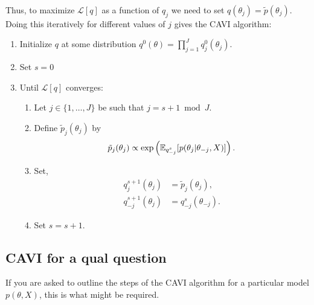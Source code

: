 Thus, to maximize $\mathcal{L}[q]$ as a function of $q_j$ we need to set $q(\theta_j)=\tilde{p}(\theta_j)$. Doing this iteratively for different values of $j$ gives the CAVI algorithm:
\begin{enumerate}
    \item Initialize $q$ at some distribution $q^0(\theta) = \prod_{j=1}^J q^0_j(\theta_j)$. 
    \item Set $s=0$
    \item Until $\mathcal{L}[q]$ converges:
    \begin{enumerate}
        \item Let $j \in \{1,\ldots, J\}$ be such that $j=s+1 \bmod J$.
        \item Define $\tilde{p}_j(\theta_j)$ by 
        \[\tilde{p}_j(\theta_j) \propto \exp\left({\mathbb E}_{q_{-j}^s}[p(\theta_j |  \theta_{-j},X)]\right). \]
        \item Set,
        \begin{align*}
            q_j^{s+1}(\theta_j)&=\tilde{p}_j(\theta_j),\\
            q_{-j}^{s+1}(\theta_j)&=q_{-j}^s(\theta_{-j}).
        \end{align*}
        \item Set $s=s+1$.
    \end{enumerate}
\end{enumerate}

\subsection{CAVI for a qual question}

If you are asked to outline the steps of the CAVI algorithm for a particular model $p(\theta,X)$, this is what might be required.

